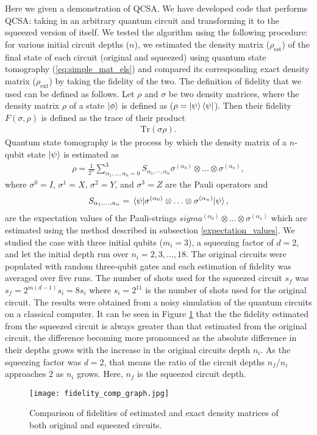 \documentclass[10pt]{article}
\begin{document}
Here we given a demonstration of QCSA. We have developed code that performs QCSA: taking in an arbitrary quantum circuit and transforming it to the squeezed version of itself. We tested the algorithm using the following procedure: for various initial circuit depths ($n$), we estimated the density matrix ($\rho_{\text{est}}$) of the final state of each circuit (original and squeezed) using quantum state tomography (\ref{eq:simple_mat_els}) and compared its corresponding exact density matrix ($\rho_{\text{ext}}$) by taking the fidelity of the two. The definition of fidelity that we used can be defined as follows. Let $\rho$ and $\sigma$ be two density matrices, where the density matrix $\rho$ of a state $\ket{\phi}$ is defined as ($\rho = \ket{\psi}\bra{\psi}$).
Then their fidelity $F(\sigma,\rho)$ is defined as the trace of their product
\begin{align}
\label{def:fidelity}
\text{Tr}(\sigma\rho).
\end{align}
Quantum state tomography is the process by which the density matrix of a $n$-qubit state $\ket{\psi}$ is estimated as
\begin{align}
\label{quantum_state_tomo}
\rho=\frac{1}{2^n}\sum_{\alpha_1,\ldots,\alpha_n=0}^3S_{\alpha_1,\cdots,\alpha_n}\sigma^{(\alpha_0)}\otimes\ldots\otimes\sigma^{(\alpha_n)},
\end{align}
where  $\sigma^0=I$, $\sigma^1=X$, $\sigma^2=Y$, and $\sigma^3=Z$ are the Pauli operators and
\begin{align}
S_{\alpha_1,\ldots,\alpha_n}
=
\mel{\psi}{\sigma^{(\alpha_0)}\otimes\ldots\otimes\sigma^{(\alpha_n)}}{\psi},
\end{align}
are the expectation values of the Pauli-strings $sigma^{(\alpha_0)}\otimes\ldots\otimes\sigma^{(\alpha_n)}$ which are estimated using the method described in subsection \ref{expectation_values}. We studied the case with three initial qubits ($m_i=3$), a squeezing factor of $d=2$, and let the initial depth run over $n_i=2,3,\ldots,18$. The original circuits were populated with random three-qubit gates and each estimation of fidelity was averaged over five runs. The number of shots used for the squeezed circuit $s_f$ was $s_f=2^{m(d-1)}s_i=8s_i$ where $s_i=2^11$ is the number of shots used for the original circuit. The results were obtained from a noisy simulation of the quantum circuits on a classical computer. It can be seen in Figure \ref{fidelity_comp_graph} that the the fidelity estimated from the squeezed circuit is always greater than that estimated from the original circuit, the difference becoming more pronounced as the absolute difference in their depths grows with the increase in the original circuits depth $n_i$. As the squeezing factor was $d=2$, that means the ratio of the circuit depths $n_f/n_i$ approaches 2 as $n_i$ grows. Here, $n_f$ is the squeezed circuit depth.
\begin{figure}[H]
    \centering
    \texttt{[image: fidelity\_comp\_graph.jpg]}
    \caption{Comparison of fidelities of estimated and exact density matrices of both original and squeezed circuits.}
    \label{fidelity_comp_graph}
\end{figure}
\end{document}
